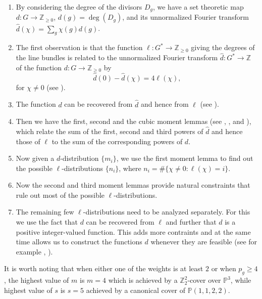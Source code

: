 \documentclass[12pt,twoside,]{amsart}
\theoremstyle{plain}
\theoremstyle{definition}
\newcommand{\Z}{\mathbb Z}
\newcommand{\G}{G}                      %
\begin{document}
\begin{enumerate}
\item By considering the degree of the divisors $D_g$, we have a set theoretic map $d: G \to \mathbb{Z}_{\geq 0}$, $d(g) = \deg(D_g)$, and its unnormalized Fourier transform
$\widehat{d}(\chi) = \sum_g \chi(g) d(g)$.
 \item The first observation is that the function $\ell: \G^* \to \mathbb{Z}_{\geq 0}$ giving the degrees of the line bundles is related to the unnormalized Fourier transform $\widehat{d}: G^* \to \mathbb{Z}$ of the function $d: G \to \mathbb{Z}_{\geq 0}$ by 
 \[
\widehat{d}(0) - \widehat{d}(\chi) = 4 \ell(\chi),
\]
for $\chi \neq 0$ (see ).

 \item The function $d$ can be recovered from $\widehat{d}$ and hence from $\ell$ (see ).

 \item Then we have the first, second and the cubic moment lemmas (see , ,  and ), which relate the sum of the first, second and third powers of $\widehat{d}$ and hence those of $\ell$ to the sum of the corresponding powers of $d$. 

 \item Now given a $d$-distribution $\{m_i\}$, we use the first moment lemma to find out the possible $\ell$-distributions $\{n_i\}$, where $n_i=\#\{\chi\neq 0:\ell(\chi)=i\}$. 

 \item Now the second and third moment lemmas provide natural constraints that rule out most of the possible $\ell$-distributions. 

 \item The remaining few $\ell$-distributions need to be analyzed separately. For this we use the fact that $d$ can be recovered from $\ell$ and further that $d$ is a positive integer-valued function. This adds more contraints and at the same time allows us to construct the functions $d$ whenever they are feasible (see for example , ).
 
\end{enumerate}

 
 
It is worth noting that when either one of the weights is at least $2$ or when $p_g \geq 4$, the highest value of $m$ is $m = 4$ which is achieved by a $\mathbb{Z}_2^2$-cover over $\mathbb{P}^3$, while highest value of $s$ is $s = 5$ achieved by a canonical cover of $\mathbb{P}(1,1,2,2)$. 
\end{document}
